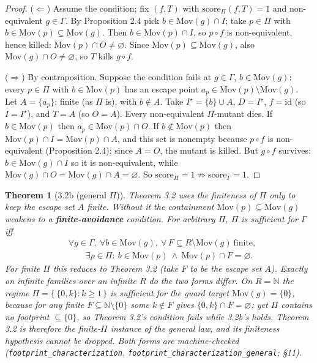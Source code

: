 \documentclass[conference]{IEEEtran}
\newcommand{\Mov}{\mathrm{Mov}}
\newcommand{\score}{\mathrm{score}}
\theoremstyle{run}
\newtheorem*{theorem}{Theorem}
\begin{document}
\begin{proof}
($\Leftarrow$) Assume the condition; fix $(f,T)$ with $\score_\Pi(f,T)=1$ and non-equivalent $g\in\Gamma$. By Proposition 2.4 pick $b \in \Mov(g)\cap I$; take $p\in\Pi$ with $b\in\Mov(p)\subseteq\Mov(g)$. Then $b\in\Mov(p)\cap I$, so $p\circ f$ is non-equivalent, hence killed: $\Mov(p)\cap O\neq\varnothing$. Since $\Mov(p)\subseteq\Mov(g)$, also $\Mov(g)\cap O\neq\varnothing$, so $T$ kills $g\circ f$.

($\Rightarrow$) By contraposition. Suppose the condition fails at $g\in\Gamma$, $b\in\Mov(g)$: every $p\in\Pi$ with $b\in\Mov(p)$ has an escape point $a_p\in\Mov(p)\setminus\Mov(g)$. Let $A = \{a_p\}$; finite (as $\Pi$ is), with $b\notin A$. Take $I^\star = \{b\}\cup A$, $D = I^\star$, $f = \mathrm{id}$ (so $I = I^\star$), and $T = A$ (so $O = A$). Every non-equivalent $\Pi$-mutant dies. If $b\in\Mov(p)$ then $a_p\in\Mov(p)\cap O$. If $b\notin\Mov(p)$ then $\Mov(p)\cap I = \Mov(p)\cap A$, and this set is nonempty because $p\circ f$ is non-equivalent (Proposition 2.4); since $A = O$, the mutant is killed. But $g\circ f$ survives: $b\in\Mov(g)\cap I$ so it is non-equivalent, while $\Mov(g)\cap O = \Mov(g)\cap A = \varnothing$. So $\score_\Pi = 1 \not\Rightarrow \score_\Gamma = 1$.
\end{proof}

\begin{theorem}[3.2b (general $\Pi$)]
Theorem 3.2 uses the finiteness of $\Pi$ only to keep the escape set $A$ finite. Without it the containment $\Mov(p) \subseteq \Mov(g)$ weakens to a \textbf{finite-avoidance} condition. For \emph{arbitrary} $\Pi$, $\Pi$ is sufficient for $\Gamma$ iff \[\begin{aligned} &\forall g \in \Gamma,\ \forall b \in \Mov(g),\ \forall\, F \subseteq R \setminus \Mov(g)\ \text{finite},\\ &\qquad \exists p \in \Pi:\ b \in \Mov(p) \ \wedge\ \Mov(p) \cap F = \varnothing. \end{aligned}\] For finite $\Pi$ this reduces to Theorem 3.2 (take $F$ to be the escape set $A$). Exactly on infinite families over an infinite $R$ do the two forms differ. On $R = \mathbb{N}$ the regime $\Pi = \{\, \{0,k\} : k \ge 1 \,\}$ is sufficient for the guard target $\Mov(g) = \{0\}$, because for any finite $F \subseteq \mathbb{N}\setminus\{0\}$ some $k \notin F$ gives $\{0,k\} \cap F = \varnothing$; yet $\Pi$ contains no footprint $\subseteq \{0\}$, so Theorem 3.2's condition \emph{fails} while 3.2b's \emph{holds}. Theorem 3.2 is therefore the finite-$\Pi$ instance of the general law, and its finiteness hypothesis cannot be dropped. Both forms are machine-checked (\texttt{footprint\_characterization}, \texttt{footprint\_characterization\_general}; \S 11).
\end{theorem}
\end{document}
